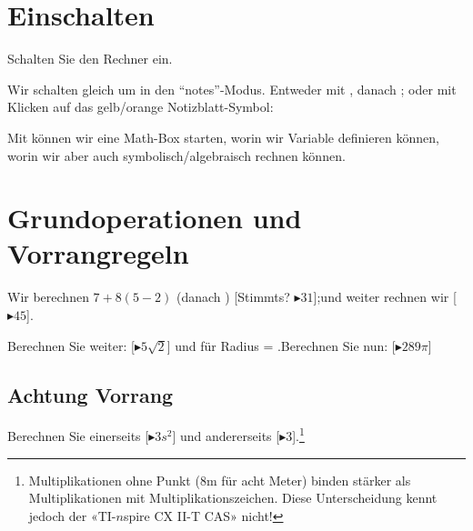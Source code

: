 



\usepackage{amssymb} %
\renewcommand{\metaHeaderLine}{Arbeitsblatt}
\renewcommand{\arbeitsblattTitel}{Taschenrechner TI-$n$spire CX II-T CAS --- Einführung}

\arbeitsblattHeader{}

\section{Einschalten}
Schalten Sie den Rechner ein. 

Wir schalten gleich um in den ``notes''-Modus.
Entweder mit , danach  ; oder mit Klicken auf
das gelb/orange Notizblatt-Symbol:

Mit   können wir eine Math-Box starten, worin wir Variable definieren können, worin wir aber auch symbolisch/algebraisch rechnen können.


\section{Grundoperationen und Vorrangregeln}
Wir berechnen $7 + 8(5-2)$ (danach ) [Stimmts? $\blacktriangleright 31$];\newline und weiter rechnen wir  [$\blacktriangleright 45$].

Berechnen Sie weiter:  [$\blacktriangleright 5\sqrt{2}$] 
und für Radius = .\newline{}Berechnen Sie nun:  [$\blacktriangleright 289 \pi$]

\subsection{Achtung Vorrang}
Berechnen Sie einerseits  [$\blacktriangleright 3s^2$] und andererseits  [$\blacktriangleright 3$].\footnote{Multiplikationen ohne Punkt (\zB 8m für acht Meter) binden stärker als Multiplikationen mit Multiplikationszeichen. Diese Unterscheidung kennt jedoch der «TI-$n$spire CX II-T CAS» nicht!}

